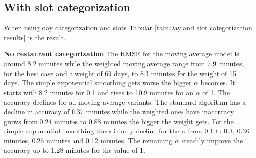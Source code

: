 \subsection{With slot categorization}
When using day categorization and slots Tabular \ref{tab:Day and slot categorization results} is the result.
\begin{table}[h]
\centering
\caption{Day categorization with slots}
\label{tab:Day and slot categorization results}
\end{table}
\newline\newline\textbf{No restaurant categorization}\newline
The RMSE for the moving average model is around 8.2 minutes while the weighted moving average range from 7.9 minutes, for the best case and a weight of 60 days, to 8.3 minutes for the weight of 15 days. The simple exponential smoothing gets worse the bigger $\alpha$ becomes. It starts with 8.2 minutes for 0.1 and rises to 10.9 minutes for an $\alpha$ of 1. The accuracy declines for all moving average variants. The standard algorithm has a decline in accuracy of 0.37 minutes while the weighted ones have inaccuracy grows from 0.24 minutes to 0.88 minutes the bigger the weight gets. For the simple exponential smoothing there is only decline for the $\alpha$ from 0.1 to 0.3, 0.36 minutes, 0.26 minutes and 0.12 minutes. The remaining $\alpha$ steadily improve the accuracy up to 1.28 minutes for the value of 1.\newline
